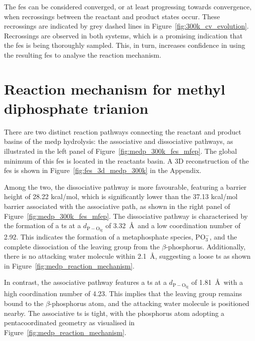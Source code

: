 The \ac{fes} can be considered converged, or at least progressing towards convergence, when recrossings between the reactant and product states occur. These recrossings are indicated by grey dashed lines in Figure~\ref{fig:300k_cv_evolution}. Recrossings are observed in both systems, which is a promising indication that the \ac{fes} is being thoroughly sampled. This, in turn, increases confidence in using the resulting \ac{fes} to analyse the reaction mechanism.


\section{Reaction mechanism for methyl diphosphate trianion}

There are two distinct reaction pathways connecting the reactant and product basins of the \ac{medp} hydrolysis: the associative and dissociative pathways, as illustrated in the left panel of Figure~\ref{fig:medp_300k_fes_mfep}. The global minimum of this \ac{fes} is located in the reactants basin. A 3D reconstruction of the \ac{fes} is shown in Figure~\ref{fig:fes_3d_medp_300k} in the Appendix.

Among the two, the dissociative pathway is more favourable, featuring a barrier height of 28.22 kcal/mol, which is significantly lower than the 37.13 kcal/mol barrier associated with the associative path, as shown in the right panel of Figure~\ref{fig:medp_300k_fes_mfep}. The dissociative pathway is characterised by the formation of a \ac{ts} at a $d_\mathrm{P-O_{\mathrm{lg}}}$ of 3.32~\AA\ and a low coordination number of 2.92. This indicates the formation of a metaphosphate species, PO$_3^-$, and the complete dissociation of the leaving group from the $\beta$-phosphorus. Additionally, there is no attacking water molecule within 2.1~\AA, suggesting a loose \ac{ts} as shown in Figure~\ref{fig:medp_reaction_mechanism}.

In contrast, the associative pathway features a \ac{ts} at a $d_\mathrm{P-O_{\mathrm{lg}}}$ of 1.81~\AA\ with a high coordination number of 4.23. This implies that the leaving group remains bound to the $\beta$-phosphorus atom, and the attacking water molecule is positioned nearby. The associative \ac{ts} is tight, with the phosphorus atom adopting a pentacoordinated geometry as visualised in Figure~\ref{fig:medp_reaction_mechanism}.

